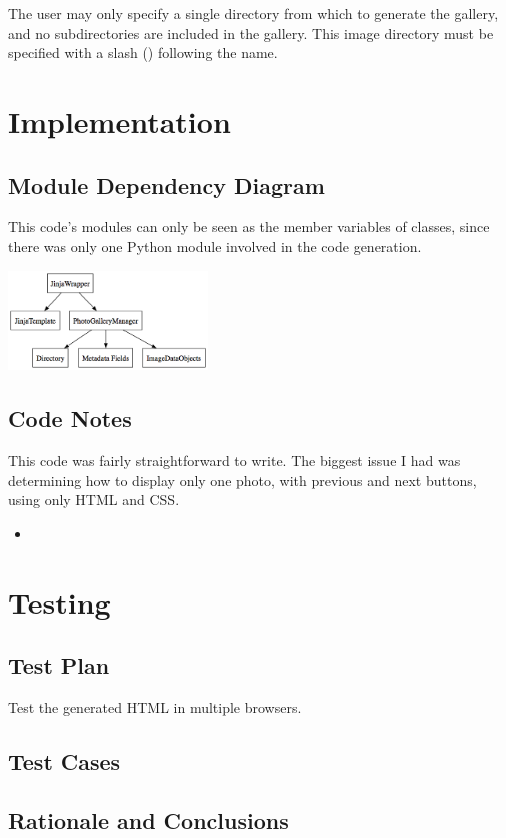 \documentclass[11pt,letterpaper]{article}
\begin{document}
The user may only specify a single directory from which to generate the gallery, and no subdirectories are included in the gallery. This image directory must be specified with a slash (\/) following the name.


\section{Implementation}

\subsection{Module Dependency Diagram}
This code's modules can only be seen as the member variables of classes, since there was only one Python module involved in the code generation.
\begin{center}
\includegraphics[width=150pt]{dot/moddepdiagram.png}
\label{fig:ob2} 
\end{center}
\subsection{Code Notes}
This code was fairly straightforward to write. The biggest issue I had was determining how to display only one photo, with previous and next buttons, using only HTML and CSS.

\begin{itemize}
\item 
\end{itemize}



\section{Testing}

\subsection{Test Plan}
Test the generated HTML in multiple browsers.
\subsection{Test Cases}
\subsection{Rationale and Conclusions}
\end{document}

